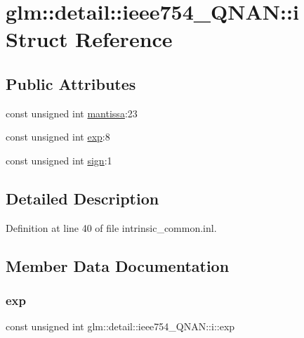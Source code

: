 \hypertarget{structglm_1_1detail_1_1ieee754___q_n_a_n_1_1i}{}\section{glm\+:\+:detail\+:\+:ieee754\+\_\+\+Q\+N\+AN\+:\+:i Struct Reference}
\label{structglm_1_1detail_1_1ieee754___q_n_a_n_1_1i}
\subsection*{Public Attributes}
\begin{DoxyCompactItemize}
\item 
const unsigned int \hyperlink{structglm_1_1detail_1_1ieee754___q_n_a_n_1_1i_a1999926defcba631a716bee7d3044d0a}{mantissa}\+:23
\item 
const unsigned int \hyperlink{structglm_1_1detail_1_1ieee754___q_n_a_n_1_1i_abc8cdb38ff3aa6a09214f7bfa32efac8}{exp}\+:8
\item 
const unsigned int \hyperlink{structglm_1_1detail_1_1ieee754___q_n_a_n_1_1i_a5dd7e174864b6a8cd045563dde44f305}{sign}\+:1
\end{DoxyCompactItemize}


\subsection{Detailed Description}


Definition at line 40 of file intrinsic\+\_\+common.\+inl.



\subsection{Member Data Documentation}
\mbox{\label{structglm_1_1detail_1_1ieee754___q_n_a_n_1_1i_abc8cdb38ff3aa6a09214f7bfa32efac8}} 
\subsubsection{\texorpdfstring{exp}{exp}}
{\footnotesize\ttfamily const unsigned int glm\+::detail\+::ieee754\+\_\+\+Q\+N\+A\+N\+::i\+::exp}




